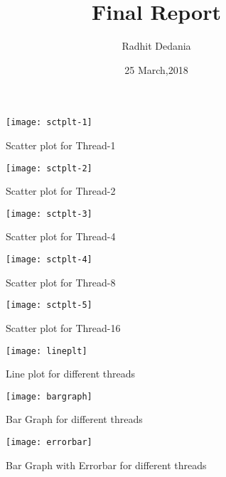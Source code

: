 \documentclass[a4paper, 10pt]{report}
\title{Final Report}
\author{Radhit Dedania}
\date{25 March,2018}
\begin{document}
\maketitle

\listoffigures

\begin{figure}
\centering
\texttt{[image: sctplt-1]}
 \caption{Scatter plot for Thread-1}
 \label{Figure-1:Scatter plot for Thread-1}
\end{figure}

\begin{figure}
\centering
\texttt{[image: sctplt-2]}
 \caption{Scatter plot for Thread-2}
 \label{Figure-2:Scatter plot for Thread-2}
\end{figure}

\begin{figure}
\centering
\texttt{[image: sctplt-3]}
 \caption{Scatter plot for Thread-4}
 \label{Figure-3:Scatter plot for Thread-4}
\end{figure}

\begin{figure}
\centering
\texttt{[image: sctplt-4]}
 \caption{Scatter plot for Thread-8}
 \label{Figure-4:Scatter plot for Thread-8}
\end{figure}

\begin{figure}
\centering
\texttt{[image: sctplt-5]}
 \caption{Scatter plot for Thread-16}
 \label{Figure-5:Scatter plot for Thread-16}
\end{figure}

\begin{figure}
\centering
\texttt{[image: lineplt]}
 \caption{Line plot for different threads}
 \label{Figure-6:Line plot for different threads}
\end{figure}

\begin{figure}
\centering
\texttt{[image: bargraph]}
 \caption{Bar Graph for different threads}
 \label{Figure-7:Bar Graph for different threads}
\end{figure}

\begin{figure}
\centering
\texttt{[image: errorbar]}
 \caption{Bar Graph with Errorbar for different threads}
 \label{Figure-8:Bar Graph with Errorbar for different threads}
\end{figure}
\end{document}
